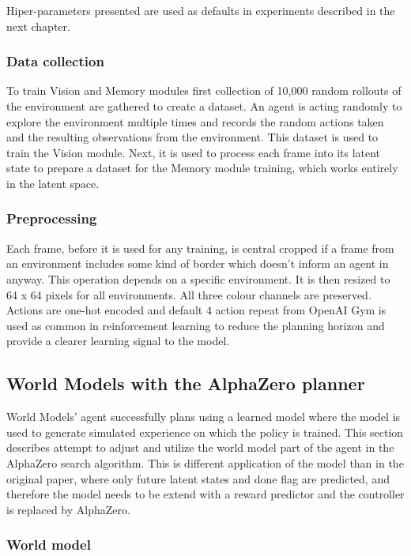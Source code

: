 Hiper-parameters presented are used as defaults in experiments described in the next chapter.

\subsubsection{Data collection}

To train Vision and Memory modules first collection of 10,000 random rollouts of the environment are gathered to create a dataset. An agent is acting randomly to explore the environment multiple times and records the random actions taken and the resulting observations from the environment.
This dataset is used to train the Vision module. Next, it is used to process each frame into its latent state to prepare a dataset for the Memory module training, which works entirely in the latent space.

\subsubsection{Preprocessing}

Each frame, before it is used for any training, is central cropped if a frame from an environment includes some kind of border which doesn't inform an agent in anyway. This operation depends on a specific environment. It is then resized to 64 x 64 pixels for all environments. All three colour channels are preserved. Actions are one-hot encoded and default 4 action repeat from OpenAI Gym \cite{Code.OpenAIGym} is used as common in reinforcement learning \cite{Algo.DQN} to reduce the planning horizon and provide a clearer learning signal to the model.

\subsection{World Models with the AlphaZero planner}

World Models' agent \cite{Algo.WorldModels} successfully plans using a learned model where the model is used to generate simulated experience on which the policy is trained. This section describes attempt to adjust and utilize the world model part of the agent in the AlphaZero search algorithm. This is different application of the model than in the original paper, where only future latent states and done flag are predicted, and therefore the model needs to be extend with a reward predictor and the controller is replaced by AlphaZero.

\subsubsection{World model}

